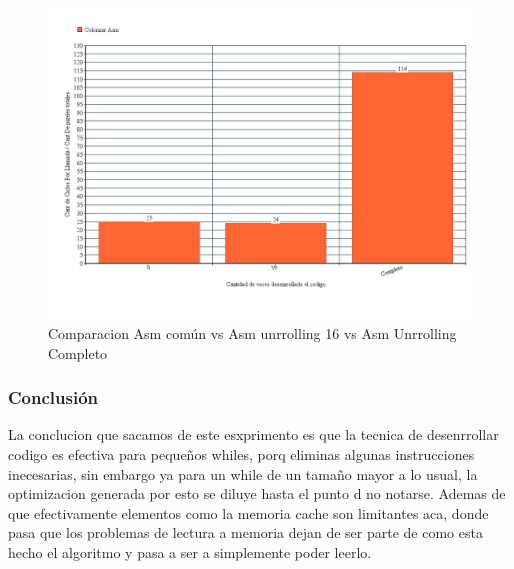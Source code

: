 \begin{figure}[h!]
\centering
\captionsetup{justification=centering}
	\includegraphics[width = 15 cm, height = 8 cm]{imagenes/unroll.jpg}
	\caption[center]{Comparacion Asm común vs Asm unrrolling 16  vs Asm Unrrolling Completo}
\end{figure}

\medskip

	
\subsubsection{Conclusión}
La conclucion que sacamos de este esxprimento es que la tecnica de desenrrollar codigo es efectiva para pequeños whiles, porq eliminas algunas instrucciones inecesarias, sin embargo ya para un while de un tamaño mayor a lo usual, la optimizacion generada por esto se diluye hasta el punto d  no notarse. Ademas de que efectivamente elementos como la memoria cache son limitantes aca, donde pasa que los problemas de lectura a memoria dejan de ser parte de como esta hecho el algoritmo y pasa a ser a simplemente poder leerlo. 
 
